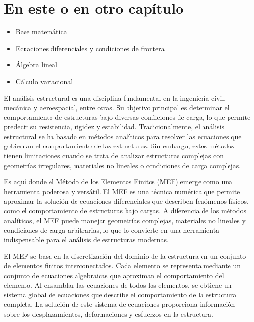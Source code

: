 \section{En este o en otro capítulo}

\begin{itemize}
	\item Base matemática
	\item Ecuaciones diferenciales y condiciones de frontera
	\item Álgebra lineal
	\item Cálculo variacional
\end{itemize}

El análisis estructural es una disciplina fundamental en la ingeniería civil, mecánica y aeroespacial, entre otras.  Su objetivo principal es determinar el comportamiento de estructuras bajo diversas condiciones de carga, lo que permite predecir su resistencia, rigidez y estabilidad.  Tradicionalmente, el análisis estructural se ha basado en métodos analíticos para resolver las ecuaciones que gobiernan el comportamiento de las estructuras. Sin embargo, estos métodos tienen limitaciones cuando se trata de analizar estructuras complejas con geometrías irregulares, materiales no lineales o condiciones de carga complejas.

Es aquí donde el Método de los Elementos Finitos (MEF) emerge como una herramienta poderosa y versátil. El MEF es una técnica numérica que permite aproximar la solución de ecuaciones diferenciales que describen fenómenos físicos, como el comportamiento de estructuras bajo cargas.  A diferencia de los métodos analíticos, el MEF puede manejar geometrías complejas, materiales no lineales y condiciones de carga arbitrarias, lo que lo convierte en una herramienta indispensable para el análisis de estructuras modernas.


El MEF se basa en la discretización del dominio de la estructura en un conjunto de elementos finitos interconectados.  Cada elemento se representa mediante un conjunto de ecuaciones algebraicas que aproximan el comportamiento del elemento. Al ensamblar las ecuaciones de todos los elementos, se obtiene un sistema global de ecuaciones que describe el comportamiento de la estructura completa.  La solución de este sistema de ecuaciones proporciona información sobre los desplazamientos, deformaciones y esfuerzos en la estructura.

